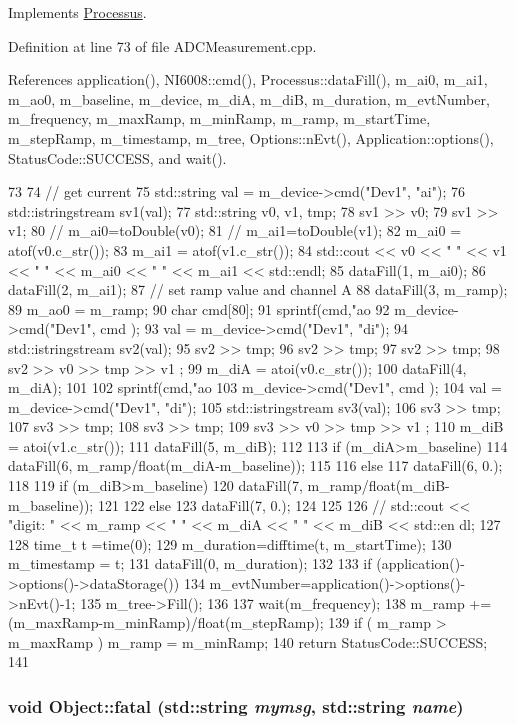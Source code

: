 Implements \hyperlink{classProcessus_a63767a63a1fb0055c5aa45b21a4a5d58}{Processus}.

Definition at line 73 of file ADCMeasurement.cpp.

References application(), NI6008::cmd(), Processus::dataFill(), m\_\-ai0, m\_\-ai1, m\_\-ao0, m\_\-baseline, m\_\-device, m\_\-diA, m\_\-diB, m\_\-duration, m\_\-evtNumber, m\_\-frequency, m\_\-maxRamp, m\_\-minRamp, m\_\-ramp, m\_\-startTime, m\_\-stepRamp, m\_\-timestamp, m\_\-tree, Options::nEvt(), Application::options(), StatusCode::SUCCESS, and wait().


\begin{DoxyCode}
73                                      {
74   // get current
75   std::string val = m_device->cmd("Dev1", "ai");
76   std::istringstream sv1(val);
77   std::string v0, v1, tmp;
78   sv1 >> v0;
79   sv1 >> v1;
80   //  m_ai0=toDouble(v0);
81   //  m_ai1=toDouble(v1);
82   m_ai0 = atof(v0.c_str());
83   m_ai1 = atof(v1.c_str());
84   std::cout << v0 << " " << v1 << " " << m_ai0 << " " << m_ai1 << std::endl;
85   dataFill(1, m_ai0);
86   dataFill(2, m_ai1);
87   // set ramp value and channel A
88   dataFill(3, m_ramp);
89   m_ao0 = m_ramp;
90   char cmd[80];
91   sprintf(cmd,"ao %
92   m_device->cmd("Dev1", cmd );
93   val = m_device->cmd("Dev1", "di");
94   std::istringstream sv2(val);
95   sv2 >> tmp;
96   sv2 >> tmp;
97   sv2 >> tmp;
98   sv2 >> v0 >> tmp >> v1 ;
99   m_diA = atoi(v0.c_str());
100   dataFill(4, m_diA);
101 
102   sprintf(cmd,"ao %
103   m_device->cmd("Dev1", cmd );
104   val = m_device->cmd("Dev1", "di");
105   std::istringstream sv3(val);
106   sv3 >> tmp;
107   sv3 >> tmp;
108   sv3 >> tmp;
109   sv3 >> v0 >> tmp >> v1 ;
110   m_diB = atoi(v1.c_str());
111   dataFill(5, m_diB);
112   
113   if (m_diA>m_baseline){ 
114     dataFill(6, m_ramp/float(m_diA-m_baseline));
115   }
116   else {
117     dataFill(6, 0.);
118   }
119   if (m_diB>m_baseline){ 
120     dataFill(7, m_ramp/float(m_diB-m_baseline));
121   }
122   else {
123     dataFill(7, 0.);
124   }
125 
126   //  std::cout << "digit: " << m_ramp << " " << m_diA << " " << m_diB << std::en
      dl;
127 
128   time_t t =time(0);
129   m_duration=difftime(t, m_startTime);
130   m_timestamp = t; 
131   dataFill(0, m_duration);
132 
133   if (application()->options()->dataStorage()){
134     m_evtNumber=application()->options()->nEvt()-1;
135     m_tree->Fill();
136   }
137   wait(m_frequency);
138   m_ramp += (m_maxRamp-m_minRamp)/float(m_stepRamp);
139   if ( m_ramp > m_maxRamp ) { m_ramp = m_minRamp; }
140   return StatusCode::SUCCESS;
141 }
\end{DoxyCode}
\hypertarget{classObject_ae62acd3d09f716220f75f252dc38bc9a}{
\subsubsection[{fatal}]{\setlength{\rightskip}{0pt plus 5cm}void Object::fatal (std::string {\em mymsg}, \/  std::string {\em name})}}
\label{classObject_ae62acd3d09f716220f75f252dc38bc9a}


